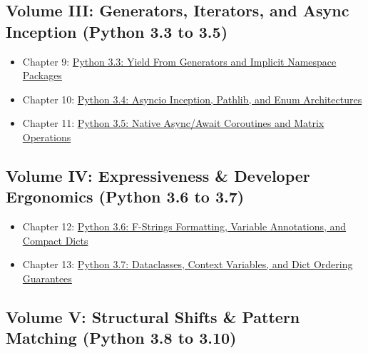\hypertarget{volume-iii-generators-iterators-and-async-inception-python-3.3-to-3.5}{%
\subsection{Volume III: Generators, Iterators, and Async Inception
(Python 3.3 to
3.5)}\label{volume-iii-generators-iterators-and-async-inception-python-3.3-to-3.5}}

\begin{itemize}
\tightlist
\item
  Chapter 9:
  \protect\hyperlink{chapter-9-python-33-yield-from-generators-and-implicit-namespace-packages}{Python
  3.3: Yield From Generators and Implicit Namespace Packages}
\item
  Chapter 10:
  \protect\hyperlink{chapter-10-python-34-asyncio-inception-pathlib-and-enum-architectures}{Python
  3.4: Asyncio Inception, Pathlib, and Enum Architectures}
\item
  Chapter 11:
  \protect\hyperlink{chapter-11-python-35-native-asyncawait-coroutines-and-matrix-operations}{Python
  3.5: Native Async/Await Coroutines and Matrix Operations}
\end{itemize}

\hypertarget{volume-iv-expressiveness-developer-ergonomics-python-3.6-to-3.7}{%
\subsection{Volume IV: Expressiveness \& Developer Ergonomics (Python
3.6 to
3.7)}\label{volume-iv-expressiveness-developer-ergonomics-python-3.6-to-3.7}}

\begin{itemize}
\tightlist
\item
  Chapter 12:
  \protect\hyperlink{chapter-12-python-36-f-strings-formatting-variable-annotations-and-compact-dicts}{Python
  3.6: F-Strings Formatting, Variable Annotations, and Compact Dicts}
\item
  Chapter 13:
  \protect\hyperlink{chapter-13-python-37-dataclasses-context-variables-and-dict-ordering-guarantees}{Python
  3.7: Dataclasses, Context Variables, and Dict Ordering Guarantees}
\end{itemize}

\hypertarget{volume-v-structural-shifts-pattern-matching-python-3.8-to-3.10}{%
\subsection{Volume V: Structural Shifts \& Pattern Matching (Python 3.8
to
3.10)}\label{volume-v-structural-shifts-pattern-matching-python-3.8-to-3.10}}


